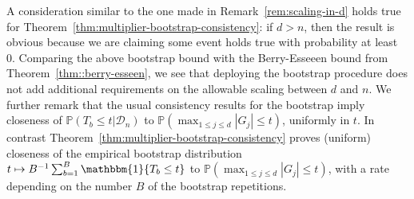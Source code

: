 \documentclass{article}
\begin{document}
A consideration similar to the one made in Remark~\ref{rem:scaling-in-d} holds true for Theorem~\ref{thm:multiplier-bootstrap-consistency}: if
$d>n$, then the result is obvious because we are claiming some event holds true with probability at least 0.
Comparing the above bootstrap bound with the Berry-Esseeen bound from Theorem~\ref{thm::berry-esseen}, we see that deploying the bootstrap procedure does not add additional requirements on the allowable scaling between $d$ and $n$.
We further remark that the usual consistency results for the bootstrap imply closeness of $\mathbb{P}(T_b \le t\big|\mathcal{D}_n)$ to $\mathbb{P}(\max_{1\le j\le d}|G_j| \le t)$, uniformly in $t$. In contrast Theorem~\ref{thm:multiplier-bootstrap-consistency} proves (uniform) closeness of the empirical bootstrap distribution $t\mapsto B^{-1}\sum_{b=1}^B \mathbbm{1}\{T_b \le t\}$ to $\mathbb{P}(\max_{1\le j\le d}|G_j| \le t)$, with a rate depending on the number $B$ of the bootstrap repetitions.
\end{document}
